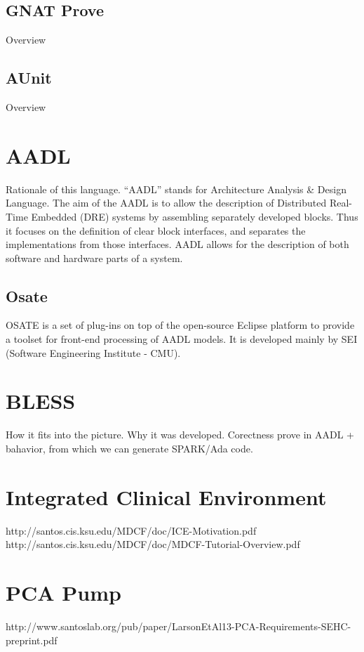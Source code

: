 \subsection{GNAT Prove}
\label{background:spark:gnatprove}
Overview

\subsection{AUnit}
\label{background:spark:aunit}
Overview


\section{AADL}
\label{background:aadl}
Rationale of this language.
“AADL” stands for Architecture Analysis \& Design Language. The aim of the AADL is to allow the description of Distributed Real-Time Embedded (DRE) systems by assembling separately developed blocks. Thus it focuses on the definition of clear block interfaces, and separates the implementations from those interfaces. AADL allows for the description of both software and hardware parts of a system. %

\subsection{Osate}
\label{background:aadl:osate}
OSATE is a set of plug-ins on top of the open-source Eclipse platform to provide a toolset for front-end processing of AADL models. It is developed mainly by SEI (Software Engineering Institute - CMU). %


\section{BLESS}
\label{background:bless}
How it fits into the picture. Why it was developed. Corectness prove in AADL + bahavior, from which we can generate SPARK/Ada code.


\section{Integrated Clinical Environment}
\label{background:ice}
http://santos.cis.ksu.edu/MDCF/doc/ICE-Motivation.pdf
http://santos.cis.ksu.edu/MDCF/doc/MDCF-Tutorial-Overview.pdf


\section{PCA Pump}
\label{background:pcapump}
http://www.santoslab.org/pub/paper/LarsonEtAl13-PCA-Requirements-SEHC-preprint.pdf



